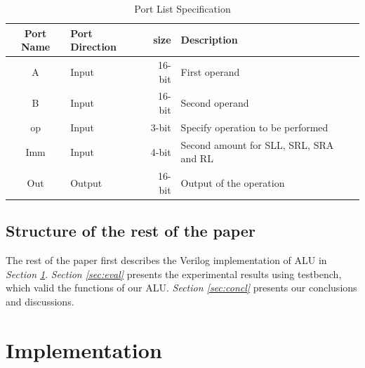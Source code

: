 \documentclass[11pt,fleqn]{article}
\begin{document}
\begin{table}
  \begin{tabular}{| c | l | r | l | c |}
    \hline
    \textbf{Port Name} & \textbf{Port Direction} & \textbf{size} & \textbf{Description}\\ \hline \hline
    A & Input & 16-bit & First operand\\ \hline
    B & Input & 16-bit & Second operand\\ \hline
    op & Input & 3-bit & Specify operation to be performed\\ \hline
    Imm & Input & 4-bit & Second amount for SLL, SRL, SRA and RL\\ \hline
    Out & Output & 16-bit & Output of the operation\\
    \hline
  \end{tabular}
  \caption{Port List Specification}
\end{table}
     



\subsection{Structure of the rest of the paper}
The rest of the paper first describes the Verilog implementation of ALU in \emph{Section \ref{sec:impl}}. \emph{Section \ref{sec:eval}} presents the experimental results using testbench, which valid the functions of our ALU. \emph{Section \ref{sec:concl}} presents our conclusions and discussions.


\section{Implementation}
\label{sec:impl}

\end{document}
